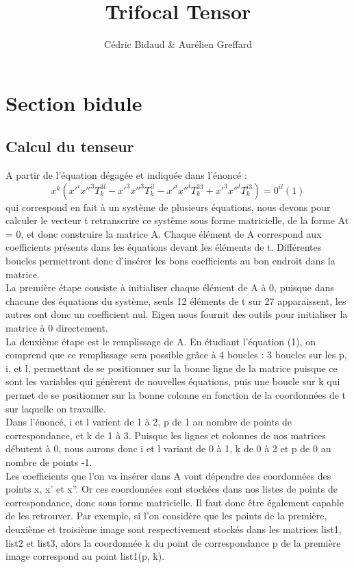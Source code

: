 \documentclass[a4paper,10pt]{report}
\title{Trifocal Tensor}
\author{Cédric Bidaud & Aurélien Greffard}
\begin{document}
\section{Section bidule}
\subsection{Calcul du tenseur}


A partir de l’équation dégagée et indiquée dans l’énoncé :
\[x^{k}(x'^{i}x''^{3}T^{3l}_{k} - x'^{3}x''^{3}T^{il}_{k} - x'^{i}x''^{l}T^{33}_{k} + x'^{3}x''^{l}T^{i3}_{k}) = 0^{il}  (1)\]
qui correspond en fait à un système de plusieurs équations, nous devons pour calculer le vecteur t retranscrire ce système sous forme matricielle, de la forme At = 0, et donc construire la matrice A. Chaque élément de A correspond aux coefficients présents dans les équations devant les éléments de t. Différentes boucles permettront donc d’insérer les bons coefficients au bon endroit dans la matrice.
\\

La première étape consiste à initialiser chaque élément de A à 0, puisque dans chacune des équations du système, seuls 12 éléments de t sur 27 apparaissent, les autres ont donc un coefficient nul. Eigen nous fournit des outils pour initialiser la matrice à 0 directement.
\\

La deuxième étape est le remplissage de A. En étudiant l’équation (1), on comprend que ce remplissage sera possible grâce à 4 boucles : 3 boucles sur les p, i, et l, permettant de se positionner sur la bonne ligne de la matrice puisque ce sont les variables qui génèrent de nouvelles équations, puis une boucle sur k qui permet de se positionner sur la bonne colonne en fonction de la coordonnées de t sur laquelle on travaille.
\\

Dans l’énoncé, i et l varient de 1 à 2, p de 1 au nombre de points de correspondance, et k de 1 à 3. Puisque les lignes et colonnes de nos matrices débutent à 0, nous aurons donc i et l variant de 0 à 1, k de 0 à 2 et p de 0 au nombre de points -1.
\\

Les coefficients que l’on va insérer dans A vont dépendre des coordonnées des points x, x’ et x”. Or ces coordonnées sont stockées dans nos listes de points de correspondance, donc sous forme matricielle. Il faut donc être également capable de les retrouver. Par exemple, si l’on considère que les points de la première, deuxième et troisième image sont respectivement stockés dans les matrices list1, list2 et list3, alors la coordonnée k du point de correspondance p de la première image correspond au point list1(p, k).
\\
\end{document}

